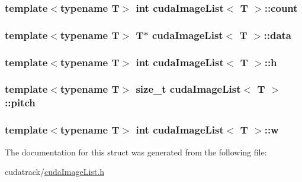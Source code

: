 \subsubsection[{\texorpdfstring{count}{count}}]{\setlength{\rightskip}{0pt plus 5cm}template$<$typename T$>$ int {\bf cuda\+Image\+List}$<$ T $>$\+::count}\hypertarget{structcuda_image_list_aecc60af52765a600acbebacf2f28c0db}{}\label{structcuda_image_list_aecc60af52765a600acbebacf2f28c0db}
\subsubsection[{\texorpdfstring{data}{data}}]{\setlength{\rightskip}{0pt plus 5cm}template$<$typename T$>$ T$\ast$ {\bf cuda\+Image\+List}$<$ T $>$\+::data}\hypertarget{structcuda_image_list_a5e32f3d282240b52b543b693723ee8ed}{}\label{structcuda_image_list_a5e32f3d282240b52b543b693723ee8ed}
\subsubsection[{\texorpdfstring{h}{h}}]{\setlength{\rightskip}{0pt plus 5cm}template$<$typename T$>$ int {\bf cuda\+Image\+List}$<$ T $>$\+::h}\hypertarget{structcuda_image_list_a90c8a96b431b4faa4759987f44d06123}{}\label{structcuda_image_list_a90c8a96b431b4faa4759987f44d06123}
\subsubsection[{\texorpdfstring{pitch}{pitch}}]{\setlength{\rightskip}{0pt plus 5cm}template$<$typename T$>$ size\+\_\+t {\bf cuda\+Image\+List}$<$ T $>$\+::pitch}\hypertarget{structcuda_image_list_a5a52e30551cba6350cbedbb2eb5693b5}{}\label{structcuda_image_list_a5a52e30551cba6350cbedbb2eb5693b5}
\subsubsection[{\texorpdfstring{w}{w}}]{\setlength{\rightskip}{0pt plus 5cm}template$<$typename T$>$ int {\bf cuda\+Image\+List}$<$ T $>$\+::w}\hypertarget{structcuda_image_list_a1fe4adbbd48678e07c6b58f50dbe8528}{}\label{structcuda_image_list_a1fe4adbbd48678e07c6b58f50dbe8528}


The documentation for this struct was generated from the following file\+:\begin{DoxyCompactItemize}
\item 
cudatrack/\hyperlink{cuda_image_list_8h}{cuda\+Image\+List.\+h}\end{DoxyCompactItemize}
